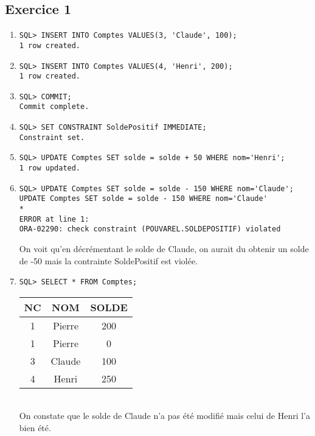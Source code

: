 \documentclass{article}
\begin{document}
\subsection*{Exercice 1} 
\begin{enumerate}[label=\arabic*)]
	\item
		\begin{lstlisting}
SQL> INSERT INTO Comptes VALUES(3, 'Claude', 100);
1 row created.
		\end{lstlisting}

	\item
		\begin{lstlisting}
SQL> INSERT INTO Comptes VALUES(4, 'Henri', 200);
1 row created.
		\end{lstlisting}

	\item
		\begin{lstlisting}
SQL> COMMIT;
Commit complete.
		\end{lstlisting}

	\item
		\begin{lstlisting}
SQL> SET CONSTRAINT SoldePositif IMMEDIATE;
Constraint set.
		\end{lstlisting}

	\item
		\begin{lstlisting}
SQL> UPDATE Comptes SET solde = solde + 50 WHERE nom='Henri';
1 row updated.
		\end{lstlisting}

	\item
		\begin{lstlisting}
SQL> UPDATE Comptes SET solde = solde - 150 WHERE nom='Claude';
UPDATE Comptes SET solde = solde - 150 WHERE nom='Claude'
*
ERROR at line 1:
ORA-02290: check constraint (POUVAREL.SOLDEPOSITIF) violated
		\end{lstlisting}

On voit qu'en décrémentant le solde de Claude, on aurait du obtenir un solde de -50 mais la contrainte SoldePositif est violée.

	\item
		\begin{lstlisting}
SQL> SELECT * FROM Comptes;
		\end{lstlisting}

\begin{tabular}{|c|c|c|}
	\hline
        	NC & NOM & SOLDE \\
	\hline        
 	1 & Pierre & 200 \\
	\hline         
	1 & Pierre & 0 \\
	\hline
	3 & Claude & 100 \\
	\hline
	4 & Henri & 250 \\
	\hline
\end{tabular} \\
On constate que le solde de Claude n'a pas été modifié mais celui de Henri l'a bien été.
	

\end{enumerate}
\end{document}
